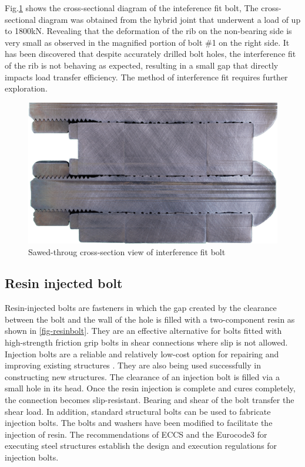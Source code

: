 Fig.\ref{fig-cs-b1} shows the cross-sectional diagram of the inteference fit bolt, The cross-sectional diagram was obtained from the hybrid joint that underwent a load of up to 1800kN. Revealing that the deformation of the rib on the non-bearing side is very small as observed in the magnified portion of bolt \#1 on the right side. It has been discovered that despite accurately drilled bolt holes, the interference fit of the rib is not behaving as expected, resulting in a small gap that directly impacts load transfer efficiency. The method of interference fit requires further exploration.

\begin{figure}
    \centering
    \includegraphics[width=0.8\linewidth]{imgs/ch2/cs-b1.pdf}
    \caption{Sawed-throug cross-section view of interference fit bolt}
    \label{fig-cs-b1}
\end{figure}


\subsection{Resin injected bolt}

Resin-injected bolts are fasteners in which the gap created by the clearance between the bolt and the wall of the hole is filled with a two-component resin as shown in \ref{fig-resinbolt}. They are an effective alternative for bolts fitted with high-strength friction grip bolts in shear connections where slip is not allowed. Injection bolts are a reliable and relatively low-cost option for repairing and improving existing structures \cite{gresnigt1996injbolt}. They are also being used successfully in constructing new structures. The clearance of an injection bolt is filled via a small hole in its head. Once the resin injection is complete and cures completely, the connection becomes slip-resistant. Bearing and shear of the bolt transfer the shear load. In addition, standard structural bolts can be used to fabricate injection bolts. The bolts and washers have been modified to facilitate the injection of resin. The recommendations of ECCS and the Eurocode3 \cite{eurocode3-21,EN14399}for executing steel structures establish the design and execution regulations for injection bolts.

